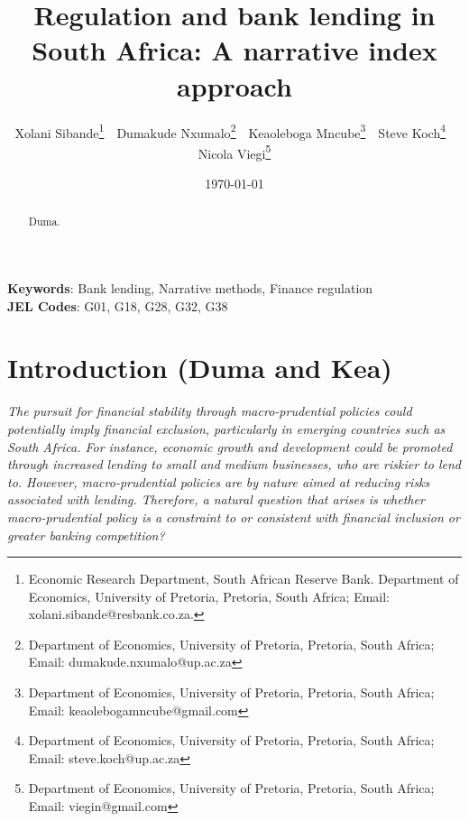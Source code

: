 \documentclass[
  letterpaper,
  DIV=11,
  numbers=noendperiod]{scrartcl}
\author{}
\date{}
\begin{document}
\title{Regulation and bank lending in South Africa: A narrative index approach}


\author {Xolani Sibande\footnote{Economic Research Department, South African Reserve Bank. Department of Economics, University of Pretoria, Pretoria, South Africa; Email: xolani.sibande@resbank.co.za.} \,\,
Dumakude Nxumalo\footnote{Department of Economics, University of Pretoria, Pretoria, South Africa; Email: dumakude.nxumalo@up.ac.za} \,\, 
Keaoleboga Mncube\footnote{Department of Economics, University of Pretoria, Pretoria, South Africa; Email: keaolebogamncube@gmail.com} \,\, 
Steve Koch\footnote{Department of Economics, University of Pretoria, Pretoria, South Africa; Email: steve.koch@up.ac.za} \,\, 
Nicola Viegi\footnote{Department of Economics, University of Pretoria, Pretoria, South Africa; Email: viegin@gmail.com}}


\date{\today}
\maketitle

\begin{abstract}
Duma.

\end{abstract}

\noindent\textbf{Keywords}: Bank lending, Narrative methods, Finance regulation\\
\textbf{JEL Codes}: G01, G18, G28, G32, G38
\newpage

\ifdefined\Shaded\renewenvironment{Shaded}{\begin{tcolorbox}[borderline west={3pt}{0pt}{shadecolor}, frame hidden, sharp corners, breakable, enhanced, boxrule=0pt, interior hidden]}{\end{tcolorbox}}\fi

\hypertarget{introduction-duma-and-kea}{%
\section{Introduction (Duma and Kea)}\label{introduction-duma-and-kea}}

\textit{The pursuit for financial stability through macro-prudential policies could potentially imply financial exclusion, particularly in emerging countries such as South Africa. For instance, economic growth and development could be promoted through increased lending to small and medium businesses, who are riskier to lend to. However, macro-prudential policies are by nature aimed at reducing risks associated with lending. Therefore, a natural question that arises is whether macro-prudential policy is a constraint to or consistent with financial inclusion or greater banking competition?}
\end{document}
